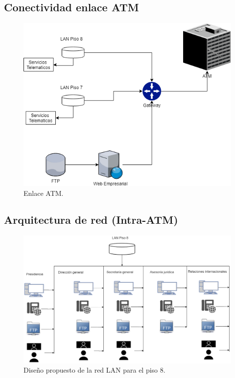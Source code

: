 \documentclass[12pt,letterpaper]{article}
\begin{document}
\newpage
\subsection{Conectividad enlace ATM}
\begin{figure}[ht]
    \centering
    \includegraphics[width=.9\textwidth]{imagenes/atmdia.png}
    \caption{Enlace ATM.}
\end{figure}

\newpage
\subsection{Arquitectura de red (Intra-ATM)}
\begin{figure}[ht]
    \centering
    \includegraphics[width=.9\textwidth,angle=90]{imagenes/Lan8.png}
    \caption{Diseño propuesto de la red LAN para el piso 8.}
\end{figure}
\end{document}
